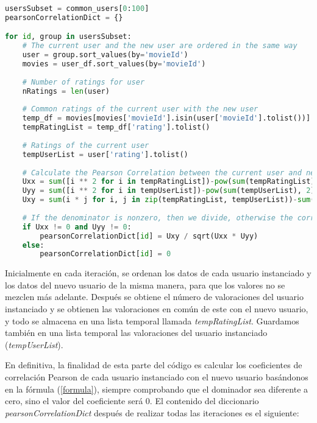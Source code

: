 \documentclass{uimppracticas}
\begin{document}
\begin{lstlisting}[language=python, basicstyle=\small]
usersSubset = common_users[0:100]	
pearsonCorrelationDict = {}

for id, group in usersSubset:
	# The current user and the new user are ordered in the same way
	user = group.sort_values(by='movieId')
	movies = user_df.sort_values(by='movieId')
	
	# Number of ratings for user
	nRatings = len(user)
	
	# Common ratings of the current user with the new user
	temp_df = movies[movies['movieId'].isin(user['movieId'].tolist())]
	tempRatingList = temp_df['rating'].tolist()
	
	# Ratings of the current user
	tempUserList = user['rating'].tolist()
	
	# Calculate the Pearson Correlation between the current user and new user
	Uxx = sum([i ** 2 for i in tempRatingList])-pow(sum(tempRatingList), 2) / float(nRatings)
	Uyy = sum([i ** 2 for i in tempUserList])-pow(sum(tempUserList), 2) / float(nRatings)
	Uxy = sum(i * j for i, j in zip(tempRatingList, tempUserList))-sum(tempRatingList) * sum(tempUserList) / float(nRatings)
	
	# If the denominator is nonzero, then we divide, otherwise the correlation is 0
	if Uxx != 0 and Uyy != 0:
		pearsonCorrelationDict[id] = Uxy / sqrt(Uxx * Uyy)
	else:
		pearsonCorrelationDict[id] = 0
\end{lstlisting}

Inicialmente en cada iteración, se ordenan los datos de cada usuario instanciado y los datos del nuevo usuario de la misma manera, para que los valores no se mezclen más adelante. Después se obtiene el número de valoraciones del usuario instanciado y se obtienen las valoraciones en común de este con el nuevo usuario, y todo se almacena en una lista temporal llamada \textit{tempRatingList}. Guardamos también en una lista temporal las valoraciones del usuario instanciado (\textit{tempUserList}). 

\newpage 

En definitiva, la finalidad de esta parte del código es calcular los coeficientes de correlación Pearson de cada usuario instanciado con el nuevo usuario basándonos en la fórmula (\ref{formula}), siempre comprobando que el dominador sea diferente a cero, sino el valor del coeficiente será 0. El contenido del diccionario \textit{pearsonCorrelationDict} después de realizar todas las iteraciones es el siguiente:
\end{document}
